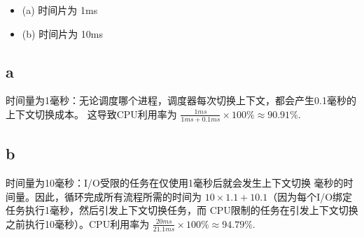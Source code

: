 \documentclass[UTF8]{homework}
\begin{document}
\begin{homeworkProblem}
\begin{itemize}
    \item (a) 时间片为 1ms
    \item (b) 时间片为 10ms
\end{itemize}

\solution

\subsection{a}

时间量为1毫秒：无论调度哪个进程，调度器每次切换上下文，都会产生0.1毫秒的上下文切换成本。
这导致CPU利用率为 $ \frac{1 ms}{1ms + 0.1 ms} \times 100 \% \approx 90.91 \% $. 

\subsection{b}

时间量为10毫秒：I/O受限的任务在仅使用1毫秒后就会发生上下文切换
毫秒的时间量。因此，循环完成所有流程所需的时间为 $ 10 \times 1.1 +
10.1 $（因为每个I/O绑定任务执行1毫秒，然后引发上下文切换任务，而
CPU限制的任务在引发上下文切换之前执行10毫秒）。CPU利用率为 $ \frac{20ms}{21.1ms} \times 100 \% \approx 94.79 \% $.

\end{homeworkProblem}



\end{document}
